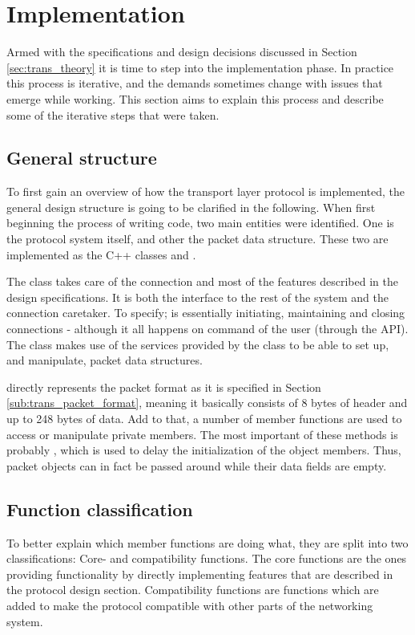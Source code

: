 \section{Implementation}\label{sec:trans_implementation}
Armed with the specifications and design decisions discussed in Section \ref{sec:trans_theory} it is time to step into the implementation phase. In practice this process is iterative, and the demands sometimes change with issues that emerge while working. This section aims to explain this process and describe some of the iterative steps that were taken.


\subsection{General structure}
To first gain an overview of how the transport layer protocol is implemented, the general design structure is going to be clarified in the following. When first beginning the process of writing code, two main entities were identified. One is the protocol system itself, and other the packet data structure. These two are implemented as the C++ classes  and .

The  class takes care of the connection and most of the features described in the design specifications. It is both the interface to the rest of the system and the connection caretaker. To specify;  is essentially initiating, maintaining and closing connections - although it all happens on command of the user (through the API). The  class makes use of the services provided by the  class to be able to set up, and manipulate, packet data structures.

 directly represents the packet format as it is specified in Section \ref{sub:trans_packet_format}, meaning it basically consists of 8 bytes of header and up to 248 bytes of data. Add to that, a number of member functions are used to access or manipulate private members. The most important of these methods is probably , which is used to delay the initialization of the object members. Thus, packet objects can in fact be passed around while their data fields are empty.


\subsection{Function classification}
To better explain which member functions are doing what, they are split into two classifications: Core- and compatibility functions. The core functions are the ones providing functionality by directly implementing features that are described in the protocol design section. Compatibility functions are functions which are added to make the protocol compatible with other parts of the networking system.

